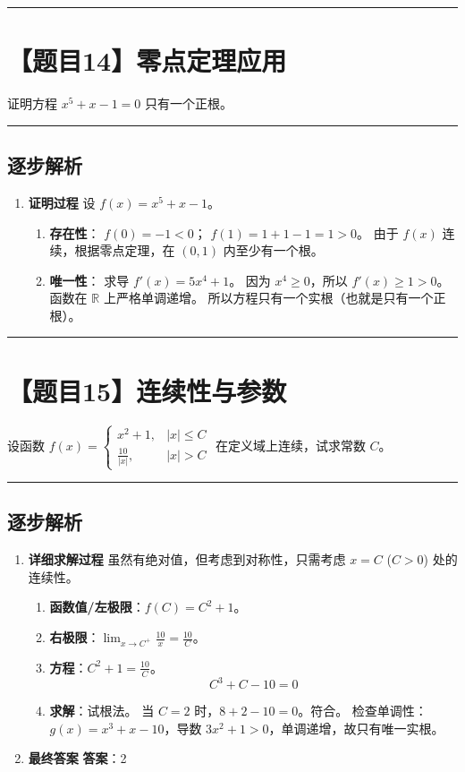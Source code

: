 \documentclass[UTF8]{ctexart}
\newenvironment{redenv}{\color{red}}{}
\newenvironment{detailedanalysis}{%
    \color{red}
    \begin{enumerate}[label=\textbf{第\arabic*步：}, leftmargin=*, align=left, itemsep=1.5ex]
}{%
    \end{enumerate}
}
\newcommand{\problemrule}{\noindent\rule{\textwidth}{1.5pt}\vspace{-0.8em}}
\newcommand{\analysisrule}{\noindent\rule{\textwidth}{0.8pt}\vspace{-0.8em}}
\begin{document}
\problemrule
\section*{【题目14】零点定理应用}
证明方程 $ x^{5}+x-1=0 $ 只有一个正根。

\begin{redenv}
\analysisrule
\subsection*{逐步解析}

\begin{detailedanalysis}
\item \textbf{证明过程}
设 $f(x) = x^5 + x - 1$。
\begin{enumerate}[label=(\arabic*)]
\item \textbf{存在性}：
$f(0) = -1 < 0$；
$f(1) = 1 + 1 - 1 = 1 > 0$。
由于 $f(x)$ 连续，根据零点定理，在 $(0, 1)$ 内至少有一个根。
\item \textbf{唯一性}：
求导 $f'(x) = 5x^4 + 1$。
因为 $x^4 \ge 0$，所以 $f'(x) \ge 1 > 0$。
函数在 $\mathbb{R}$ 上严格单调递增。
所以方程只有一个实根（也就是只有一个正根）。
\end{enumerate}
\end{detailedanalysis}
\end{redenv}

\problemrule
\section*{【题目15】连续性与参数}
设函数 $ f(x)=\begin{cases}x^{2}+1, & |x|\leq C\\ \frac{10}{|x|}, & |x|>C\end{cases} $ 在定义域上连续，试求常数 $C$。

\begin{redenv}
\analysisrule
\subsection*{逐步解析}

\begin{detailedanalysis}
\item \textbf{详细求解过程}
虽然有绝对值，但考虑到对称性，只需考虑 $x=C$ ($C>0$) 处的连续性。
\begin{enumerate}[label=(\arabic*)]
\item \textbf{函数值/左极限}：$f(C) = C^2 + 1$。
\item \textbf{右极限}：$\lim_{x \to C^+} \frac{10}{x} = \frac{10}{C}$。
\item \textbf{方程}：$C^2 + 1 = \frac{10}{C}$。
$$ C^3 + C - 10 = 0 $$
\item \textbf{求解}：试根法。
当 $C=2$ 时，$8 + 2 - 10 = 0$。符合。
检查单调性：$g(x) = x^3+x-10$，导数 $3x^2+1>0$，单调递增，故只有唯一实根。
\end{enumerate}

\item \textbf{最终答案}
\textbf{答案}：2
\end{detailedanalysis}
\end{redenv}
\end{document}
